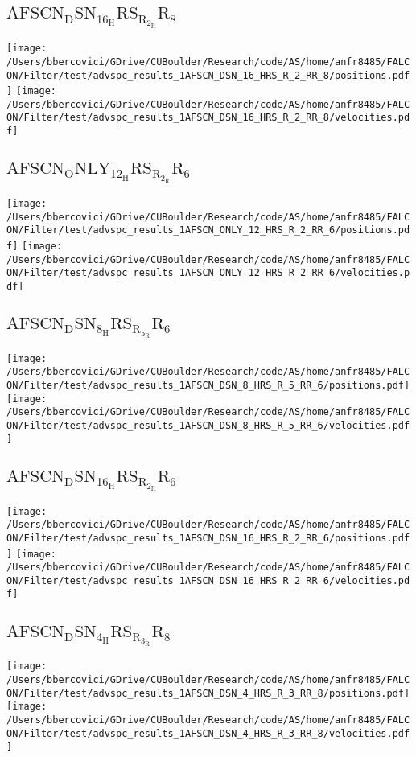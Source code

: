 \subsection{$\mathrm{AFSCN_DSN_16_HRS_R_2_RR_8}$}
\texttt{[image: /Users/bbercovici/GDrive/CUBoulder/Research/code/AS/home/anfr8485/FALCON/Filter/test/advspc\_results\_1AFSCN\_DSN\_16\_HRS\_R\_2\_RR\_8/positions.pdf]}
\texttt{[image: /Users/bbercovici/GDrive/CUBoulder/Research/code/AS/home/anfr8485/FALCON/Filter/test/advspc\_results\_1AFSCN\_DSN\_16\_HRS\_R\_2\_RR\_8/velocities.pdf]}
\subsection{$\mathrm{AFSCN_ONLY_12_HRS_R_2_RR_6}$}
\texttt{[image: /Users/bbercovici/GDrive/CUBoulder/Research/code/AS/home/anfr8485/FALCON/Filter/test/advspc\_results\_1AFSCN\_ONLY\_12\_HRS\_R\_2\_RR\_6/positions.pdf]}
\texttt{[image: /Users/bbercovici/GDrive/CUBoulder/Research/code/AS/home/anfr8485/FALCON/Filter/test/advspc\_results\_1AFSCN\_ONLY\_12\_HRS\_R\_2\_RR\_6/velocities.pdf]}
\subsection{$\mathrm{AFSCN_DSN_8_HRS_R_5_RR_6}$}
\texttt{[image: /Users/bbercovici/GDrive/CUBoulder/Research/code/AS/home/anfr8485/FALCON/Filter/test/advspc\_results\_1AFSCN\_DSN\_8\_HRS\_R\_5\_RR\_6/positions.pdf]}
\texttt{[image: /Users/bbercovici/GDrive/CUBoulder/Research/code/AS/home/anfr8485/FALCON/Filter/test/advspc\_results\_1AFSCN\_DSN\_8\_HRS\_R\_5\_RR\_6/velocities.pdf]}
\subsection{$\mathrm{AFSCN_DSN_16_HRS_R_2_RR_6}$}
\texttt{[image: /Users/bbercovici/GDrive/CUBoulder/Research/code/AS/home/anfr8485/FALCON/Filter/test/advspc\_results\_1AFSCN\_DSN\_16\_HRS\_R\_2\_RR\_6/positions.pdf]}
\texttt{[image: /Users/bbercovici/GDrive/CUBoulder/Research/code/AS/home/anfr8485/FALCON/Filter/test/advspc\_results\_1AFSCN\_DSN\_16\_HRS\_R\_2\_RR\_6/velocities.pdf]}
\subsection{$\mathrm{AFSCN_DSN_4_HRS_R_3_RR_8}$}
\texttt{[image: /Users/bbercovici/GDrive/CUBoulder/Research/code/AS/home/anfr8485/FALCON/Filter/test/advspc\_results\_1AFSCN\_DSN\_4\_HRS\_R\_3\_RR\_8/positions.pdf]}
\texttt{[image: /Users/bbercovici/GDrive/CUBoulder/Research/code/AS/home/anfr8485/FALCON/Filter/test/advspc\_results\_1AFSCN\_DSN\_4\_HRS\_R\_3\_RR\_8/velocities.pdf]}
